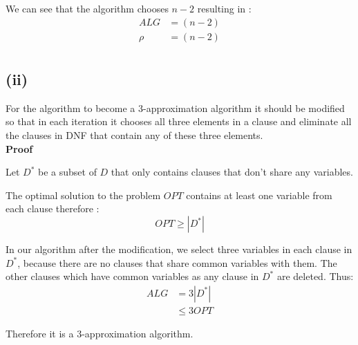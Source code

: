 We can see that the algorithm chooses $ n-2 $ resulting in :
\begin{align*}
	ALG &= (n-2)\\
	\rho &= (n-2) \\
\end{align*}

\subsection*{(ii)}
For the algorithm to become a 3-approximation algorithm it should be modified so that in each iteration it chooses all three elements in a clause and eliminate all the clauses in DNF that contain any of these three elements.\\

\textbf{Proof}

Let $ D^* $ be a subset of $ D $ that only contains clauses that don't share any variables.

The optimal solution to the problem $ OPT $ contains at least one variable from each clause therefore :
$$ OPT \ge |D^*|$$ 

In our algorithm after the modification, we select three variables in each clause in $ D^* $,
because there are no clauses that share common variables with them.
The other clauses which have common variables as any clause in $ D^* $ are deleted.
Thus:
\begin{align*}
	ALG &= 3 |D^*| \\
	&\leq 3 OPT
\end{align*}

Therefore it is a 3-approximation algorithm.
